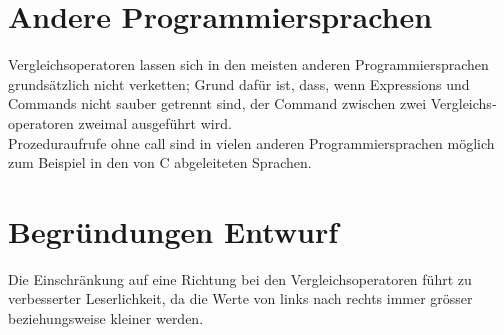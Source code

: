 \documentclass[a4paper,10pt]{article}
\begin{document}
\section{Andere Programmiersprachen}
Vergleichsoperatoren lassen sich in den meisten anderen Programmiersprachen grunds\"atzlich nicht verketten; Grund daf\"ur ist, dass, wenn Expressions und Commands nicht sauber getrennt sind, der Command zwischen zwei Vergleichs-operatoren zweimal ausgef\"uhrt wird.\\
Prozeduraufrufe ohne call sind in vielen anderen Programmiersprachen
m\"oglich zum Beispiel in den von C abgeleiteten Sprachen.
\section{Begr\"undungen Entwurf}
Die Einschr\"ankung auf eine Richtung bei den Vergleichsoperatoren
f\"uhrt zu verbesserter Leserlichkeit, da die Werte von links nach 
rechts immer gr\"osser beziehungsweise kleiner werden.
\end{document}
